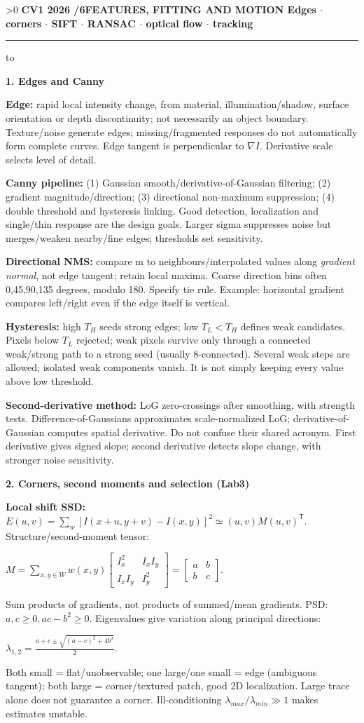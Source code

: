 \documentclass[a4paper]{article}
\newcommand{\key}[1]{\textbf{#1}}
\newcommand{\Topic}[1]{\par\vspace{1.7pt}\noindent
  {\fontsize{7.7}{8.0}\selectfont\bfseries #1}\par\vspace{0.3pt}}
\newcommand{\eq}[1]{\par\noindent\mbox{\(\displaystyle #1\)}\par}
\newcommand{\smat}[1]{\left[\begin{smallmatrix}#1\end{smallmatrix}\right]}
\newcommand{\trans}{^{\mathsf T}}
\newcounter{sheet}
\newcounter{sheetcolumn}
\newlength{\colwidth}
\newcommand{\Sheet}[2]{\ifnum\value{sheet}>0\newpage\fi
  \stepcounter{sheet}\setcounter{sheetcolumn}{0}
  {\fontsize{8.5}{9}\selectfont\bfseries CV1 2026 \quad \thesheet/6\quad #1
  \hfill {\fontsize{6.3}{7}\selectfont #2}}\par
  \vspace{-1pt}\hrule height 0.35pt\vspace{2pt}\noindent
  \hbox to\textwidth\bgroup\ignorespaces}
\newenvironment{sheetcol}[1][7.0]{\stepcounter{sheetcolumn}
  \begin{lrbox}{\columnbox}\begin{minipage}[t]{\colwidth}\vspace{0pt}
  \fontsize{#1}{\dimexpr#1pt+0.6pt\relax}\selectfont}
  {\end{minipage}\end{lrbox}
  \typeout{CV1COL|\thesheet|\thesheetcolumn|\the\dimexpr\ht\columnbox+\dp\columnbox\relax}
  \usebox{\columnbox}\ignorespacesafterend}
\begin{document}
\Sheet{FEATURES, FITTING AND MOTION}{Edges \(\cdot\) corners \(\cdot\) SIFT \(\cdot\) RANSAC \(\cdot\) optical flow \(\cdot\) tracking}
\begin{sheetcol}[6.6]
\Topic{1. Edges and Canny}
\key{Edge:} rapid local intensity change, from material, illumination/shadow, surface orientation or depth discontinuity; not necessarily an object boundary. Texture/noise generate edges; missing/fragmented responses do not automatically form complete curves. Edge tangent is perpendicular to \(\nabla I\). Derivative scale selects level of detail.

\key{Canny pipeline:} (1) Gaussian smooth/derivative-of-Gaussian filtering; (2) gradient magnitude/direction; (3) directional non-maximum suppression; (4) double threshold and hysteresis linking. Good detection, localization and single/thin response are the design goals. Larger sigma suppresses noise but merges/weaken nearby/fine edges; thresholds set sensitivity.

\key{Directional NMS:} compare m to neighbours/interpolated values along \emph{gradient normal}, not edge tangent; retain local maxima. Coarse direction bins often 0,45,90,135 degrees, modulo 180. Specify tie rule. Example: horizontal gradient compares left/right even if the edge itself is vertical.

\key{Hysteresis:} high \(T_H\) seeds strong edges; low \(T_L<T_H\) defines weak candidates. Pixels below \(T_L\) rejected; weak pixels survive only through a connected weak/strong path to a strong seed (usually 8-connected). Several weak steps are allowed; isolated weak components vanish. It is not simply keeping every value above low threshold.

\key{Second-derivative method:} LoG zero-crossings after smoothing, with strength tests. Difference-of-Gaussians approximates scale-normalized LoG; derivative-of-Gaussian computes spatial derivative. Do not confuse their shared acronym. First derivative gives signed slope; second derivative detects slope change, with stronger noise sensitivity.

\Topic{2. Corners, second moments and selection (Lab3)}
\key{Local shift SSD:} \(E(u,v)=\sum_w[I(x+u,y+v)-I(x,y)]^2\simeq (u,v)M(u,v)\trans\). Structure/second-moment tensor:
\eq{M=\sum_{x,y\in W}w(x,y)
 \smat{I_x^2&I_xI_y\\I_xI_y&I_y^2}=\smat{a&b\\b&c}.}
Sum products of gradients, not products of summed/mean gradients. PSD: \(a,c\ge0,ac-b^2\ge0\). Eigenvalues give variation along principal directions:
\eq{\lambda_{1,2}=\frac{a+c\pm\sqrt{(a-c)^2+4b^2}}2.}
Both small = flat/unobservable; one large/one small = edge (ambiguous tangent); both large = corner/textured patch, good 2D localization. Large trace alone does not guarantee a corner. Ill-conditioning \(\lambda_{max}/\lambda_{min}\gg1\) makes estimates unstable.


\end{sheetcol}
\end{document}
